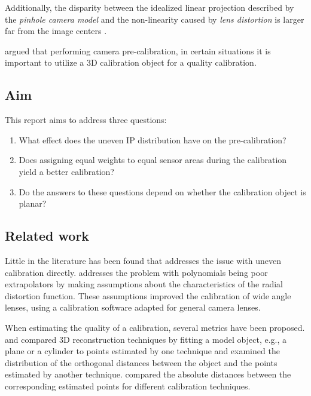     Additionally, the disparity between the idealized linear projection 
    described by the \textit{pinhole camera model} and the 
    non-linearity caused by \textit{lens distortion}
    is larger far from the image centers \citep{Brown1971:Close-range}.

    \citet{fraser_close_range} argued that performing camera pre-calibration,
    in certain situations it is important to utilize a 3D calibration object
    for a quality calibration.

\subsection{Aim}
    \label{sec:aim}

    This report aims to address three questions:

    \begin{enumerate}
        \item What effect does the uneven IP distribution have on
            the pre-calibration?
        \item Does assigning equal weights to equal sensor areas
            during the calibration yield a better calibration?
        \item Do the answers to these questions depend on whether
            the calibration object is planar?
    \end{enumerate}

\subsection{Related work}
    \label{sec:related_work}

    Little in the literature has been found that addresses the issue
    with uneven calibration directly.
    \citet{jung_lee_yoon_inverse_mapping} addresses the problem with
    polynomials being poor extrapolators by making assumptions 
    about the characteristics of the radial distortion function.
    These assumptions improved the calibration of wide angle lenses,
    using a calibration software adapted for general camera lenses.

    When estimating the quality of a calibration,
    several metrics have been proposed.
    \citet{Rabbani2007:Integrated} and 
    \citet{Grussenmeyer2008:Comparison}
    compared 3D reconstruction techniques by fitting a model object,
    e.g., a plane or a cylinder to points estimated by one technique and
    examined the distribution of the orthogonal distances between the object and 
    the points estimated by another technique.
    \citet{Boehler2003:Investigating} compared the absolute distances between 
    the corresponding estimated points for different calibration techniques.

